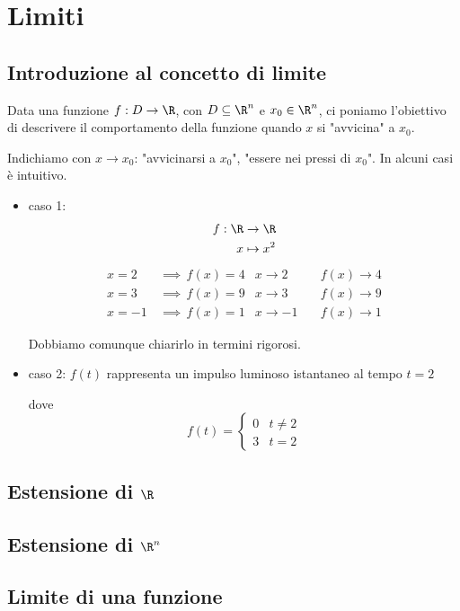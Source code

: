 \section{Limiti}
\subsection{Introduzione al concetto di limite}

Data una funzione $ f:D\to \R $, con $ D \subseteq \R^{n} $ e $ x_0 \in \R^{n} $, ci poniamo l'obiettivo di descrivere il comportamento della funzione quando $ x $ si "avvicina" a $ x_0 $.

Indichiamo con $ x\to x_0 $: "avvicinarsi a $ x_0 $", "essere nei pressi di $ x_0 $". In alcuni casi è intuitivo.
\begin{itemize}
    \item caso 1: \begin{align*}
    f:\R & \to \R \\
    x & \mapsto x^{2}
    \end{align*}\begin{align*}
        x=2 \,&\implies\, f(x)=4 & x\to 2\quad &f(x) \to 4\\
        x=3 \,&\implies\, f(x)=9 & x\to 3\quad &f(x) \to 9\\
        x=-1 \,&\implies\, f(x)=1 & x\to -1\quad &f(x) \to 1
    \end{align*}

    Dobbiamo comunque chiarirlo in termini rigorosi.
    \item caso 2: $ f(t)$ rappresenta un impulso luminoso istantaneo al tempo $ t=2 $
    \begin{center}
    \end{center} dove \[
        f(t)=\begin{cases}
            0 & t\neq 2\\
            3 & t=2
        \end{cases}
    \]
\end{itemize}
\subsection{Estensione di $ \R $}
\subsection{Estensione di $ \R^{n} $}
\subsection{Limite di una funzione}